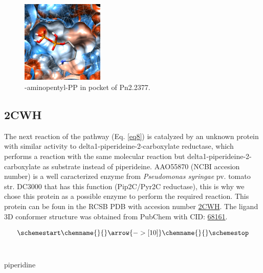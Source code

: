 \documentclass[12pt]{article}
\begin{document}
	\FloatBarrier
	
	
	\FloatBarrier
	\begin{figure}[h!]
		\centering
		\includegraphics[width=0.35\textwidth]{../9/Dock/chimera.png}
		\caption{-aminopentyl-PP in pocket of Pn2.2377.}
		\label{fig9_4}
	\end{figure}
	\FloatBarrier
	
	\subsection{2CWH}
	
	The next reaction of the pathway (Eq. \ref{eq8}) is catalyzed by an unknown protein with similar activity to delta1-piperideine-2-carboxylate reductase, which performs a reaction with the same molecular reaction but delta1-piperideine-2-carboxylate as substrate instead of piperideine. AAO55870 (NCBI accesion number) is a well caracterized enzyme  from \textit{Pseudomonas syringae} pv. tomato str. DC3000 that has this function (Pip2C/Pyr2C reductase), this is why we chose this protein as a possible enzyme to perform the required reaction. This protein can be foun in the RCSB PDB with accesion number \href{https://www.rcsb.org/structure/2CWH}{2CWH}. The ligand 3D conformer structure was obtained from PubChem with CID: \href{https://pubchem.ncbi.nlm.nih.gov/compound/68161}{68161}.
	
	\begin{equation}
	\schemestart
	\label{eq8}
	\chemname{\footnotesize}{\vspace{-30pt}}\arrow{->[ 10]}\chemname{\footnotesize}{\vspace{-30pt}}
	\schemestop
	\end{equation}\\
	
	\vspace{-30pt}\hspace{0.5\paperwidth-91pt}
	\begin{minipage}{0.345\paperwidth}
		\centering
		piperidine
	\end{minipage}\\
	
\end{document}
